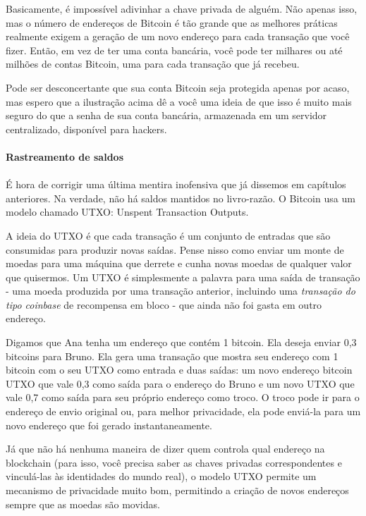 Basicamente, é impossível adivinhar a chave privada de alguém. Não apenas isso, mas o número de endereços de Bitcoin é tão grande que as melhores práticas realmente exigem a geração de um novo endereço para cada transação que você fizer. Então, em vez de ter uma conta bancária, você pode ter milhares ou até milhões de contas Bitcoin, uma para cada transação que já recebeu.

Pode ser desconcertante que sua conta Bitcoin seja protegida apenas por acaso, mas espero que a ilustração acima dê a você uma ideia de que isso é muito mais seguro do que a senha de sua conta bancária, armazenada em um servidor centralizado, disponível para hackers.

\paragraph{Rastreamento de saldos}
\paragraph{}

É hora de corrigir uma última mentira inofensiva que já dissemos em capítulos anteriores. Na verdade, não há saldos mantidos no livro-razão. O Bitcoin usa um modelo chamado UTXO: Unspent Transaction Outputs.

A ideia do UTXO é que cada transação é um conjunto de entradas que são consumidas para produzir novas saídas. Pense nisso como enviar um monte de moedas para uma máquina que derrete e cunha novas moedas de qualquer valor que quisermos. Um UTXO é simplesmente a palavra para uma saída de transação - uma moeda produzida por uma transação anterior, incluindo uma \textit{transação do tipo coinbase} de recompensa em bloco - que ainda não foi gasta em outro endereço.

Digamos que Ana tenha um endereço que contém 1 bitcoin. Ela deseja enviar 0,3 bitcoins para Bruno. Ela gera uma transação que mostra seu endereço com 1 bitcoin com o seu UTXO como entrada e duas saídas: um novo endereço bitcoin UTXO que vale 0,3 como saída para o endereço do Bruno e um novo UTXO que vale 0,7 como saída para seu próprio endereço como troco. O troco pode ir para o endereço de envio original ou, para melhor privacidade, ela pode enviá-la para um novo endereço que foi gerado instantaneamente.

Já que não há nenhuma maneira de dizer quem controla qual endereço na blockchain (para isso, você precisa saber as chaves privadas correspondentes e vinculá-las às identidades do mundo real), o modelo UTXO permite um mecanismo de privacidade muito bom, permitindo a criação de novos endereços sempre que as moedas são movidas.

